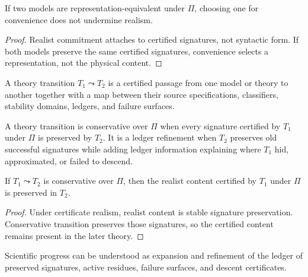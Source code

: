 \begin{corollary}
\label{cor:pragmatic-choice-realist}
If two models are representation-equivalent under $\Pi$, choosing one for convenience does not undermine realism.
\end{corollary}

\begin{proof}
Realist commitment attaches to certified signatures, not syntactic form. If both models preserve the same certified signatures, convenience selects a representation, not the physical content.
\end{proof}

\begin{definition}
\label{def:theory-transition}
A theory transition $T_1\leadsto T_2$ is a certified passage from one model or theory to another together with a map between their source specifications, classifiers, stability domains, ledgers, and failure surfaces.
\end{definition}

\begin{definition}
\label{def:conservative-signature-preservation-ledger-refinement}
A theory transition is conservative over $\Pi$ when every signature certified by $T_1$ under $\Pi$ is preserved by $T_2$. It is a ledger refinement when $T_2$ preserves old successful signatures while adding ledger information explaining where $T_1$ hid, approximated, or failed to descend.
\end{definition}

\begin{theorem}
\label{thm:theory-change-preserves-realist-content}
If $T_1\leadsto T_2$ is conservative over $\Pi$, then the realist content certified by $T_1$ under $\Pi$ is preserved in $T_2$.
\end{theorem}

\begin{proof}
Under certificate realism, realist content is stable signature preservation. Conservative transition preserves those signatures, so the certified content remains present in the later theory.
\end{proof}

\begin{corollary}
\label{cor:progress-ledger-expansion}
Scientific progress can be understood as expansion and refinement of the ledger of preserved signatures, active residues, failure surfaces, and descent certificates.
\end{corollary}

